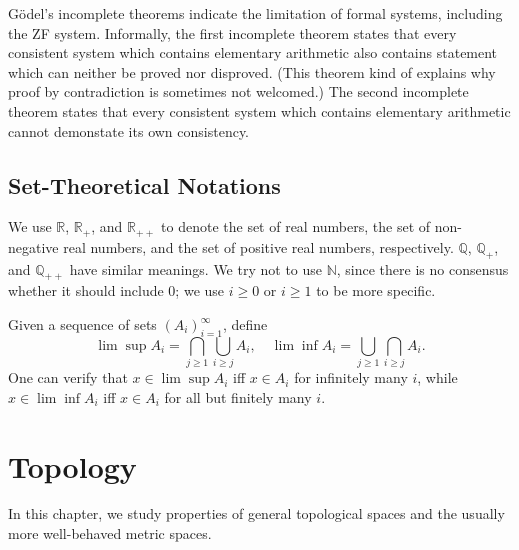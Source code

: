 \documentclass[openany]{book}
\theoremstyle{definition}
\theoremstyle{remark}
\begin{document}
G\"{o}del's incomplete theorems indicate the limitation of formal systems, including the ZF system. Informally, the first incomplete theorem states that every consistent system which contains elementary arithmetic also contains statement which can neither be proved nor disproved. (This theorem kind of explains why proof by contradiction is sometimes not welcomed.) The second incomplete theorem states that every consistent system which contains elementary arithmetic cannot demonstate its own consistency.

\section{Set-Theoretical Notations}
We use $\mathbb{R}$, $\mathbb{R}_+$, and $\mathbb{R}_{++}$ to denote the set of real numbers, the set of non-negative real numbers, and the set of positive real numbers, respectively. $\mathbb{Q}$, $\mathbb{Q}_+$, and $\mathbb{Q}_{++}$ have similar meanings. We try not to use $\mathbb{N}$, since there is no consensus whether it should include $0$; we use $i\ge0$ or $i\ge1$ to be more specific.

Given a sequence of sets $(A_i)_{i=1}^{\infty}$, define
\begin{equation*}
    \lim\sup A_i=\bigcap_{j\ge1}\bigcup_{i\ge j}A_i,\quad\lim\inf A_i=\bigcup_{j\ge1}\bigcap_{i\ge j}A_i.
\end{equation*}
One can verify that $x\in\lim\sup A_i$ iff $x\in A_i$ for infinitely many $i$, while $x\in\lim\inf A_i$ iff $x\in A_i$ for all but finitely many $i$.

\chapter{Topology}
In this chapter, we study properties of general topological spaces and the usually more well-behaved metric spaces.
\end{document}
